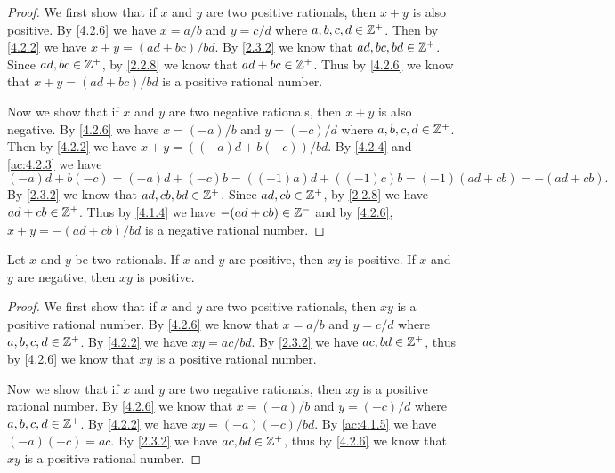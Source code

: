 \begin{proof}
  We first show that if \(x\) and \(y\) are two positive rationals, then \(x + y\) is also positive.
  By \cref{4.2.6} we have \(x = a / b\) and \(y = c / d\) where \(a, b, c, d \in \mathbb{Z}^+\).
  Then by \cref{4.2.2} we have \(x + y = (ad + bc) / bd\).
  By \cref{2.3.2} we know that \(ad, bc, bd \in \mathbb{Z}^+\).
  Since \(ad, bc \in \mathbb{Z}^+\), by \cref{2.2.8} we know that \(ad + bc \in \mathbb{Z}^+\).
  Thus by \cref{4.2.6} we know that \(x + y = (ad + bc) / bd\) is a positive rational number.

  Now we show that if \(x\) and \(y\) are two negative rationals, then \(x + y\) is also negative.
  By \cref{4.2.6} we have \(x = (-a) / b\) and \(y = (-c) / d\) where \(a, b, c, d \in \mathbb{Z}^+\).
  Then by \cref{4.2.2} we have \(x + y = ((-a)d + b(-c)) / bd\).
  By \cref{4.2.4} and \cref{ac:4.2.3} we have
  \[
    (-a)d + b(-c) = (-a)d + (-c)b = ((-1)a)d + ((-1)c)b = (-1)(ad + cb) = -(ad + cb).
  \]
  By \cref{2.3.2} we know that \(ad, cb, bd \in \mathbb{Z}^+\).
  Since \(ad, cb \in \mathbb{Z}^+\), by \cref{2.2.8} we have \(ad + cb \in \mathbb{Z}^+\).
  Thus by \cref{4.1.4} we have \(-(ad + cb) \in \mathbb{Z}^-\) and by \cref{4.2.6}, \(x + y = -(ad + cb) / bd\) is a negative rational number.
\end{proof}

\begin{ac}\label{ac:4.2.5}
  Let \(x\) and \(y\) be two rationals.
  If \(x\) and \(y\) are positive, then \(xy\) is positive.
  If \(x\) and \(y\) are negative, then \(xy\) is positive.
\end{ac}

\begin{proof}
  We first show that if \(x\) and \(y\) are two positive rationals, then \(xy\) is a positive rational number.
  By \cref{4.2.6} we know that \(x = a / b\) and \(y = c / d\) where \(a, b, c, d \in \mathbb{Z}^+\).
  By \cref{4.2.2} we have \(xy = ac / bd\).
  By \cref{2.3.2} we have \(ac, bd \in \mathbb{Z}^+\), thus by \cref{4.2.6} we know that \(xy\) is a positive rational number.

  Now we show that if \(x\) and \(y\) are two negative rationals, then \(xy\) is a positive rational number.
  By \cref{4.2.6} we know that \(x = (-a) / b\) and \(y = (-c) / d\) where \(a, b, c, d \in \mathbb{Z}^+\).
  By \cref{4.2.2} we have \(xy = (-a)(-c) / bd\).
  By \cref{ac:4.1.5} we have \((-a)(-c) = ac\).
  By \cref{2.3.2} we have \(ac, bd \in \mathbb{Z}^+\), thus by \cref{4.2.6} we know that \(xy\) is a positive rational number.
\end{proof}

